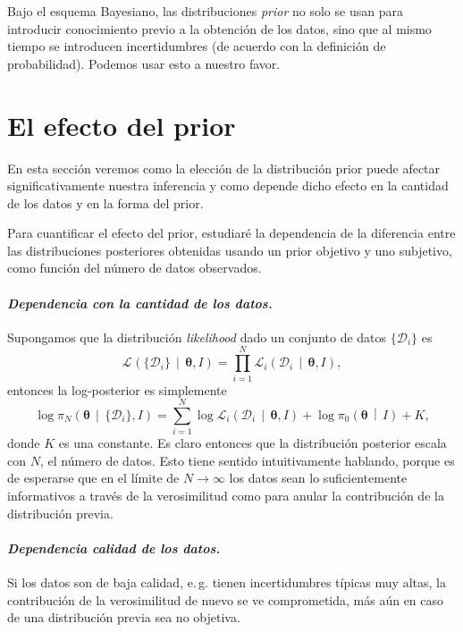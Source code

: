 \documentclass[a4paper,twoside]{article}
\newcommand{\hip}{\ensuremath{\mathbold{\theta}}\xspace}
\newcommand{\dat}[1][i]{\ensuremath{\{\mathcal{D}_{#1}\}}\xspace}
\newcommand{\pos}[2]{\ensuremath{\pi_N\left(#1\,\middle|\, #2\right)}\xspace}
\newcommand{\pri}[2]{\ensuremath{\pi_0\left(#1\,\middle|\, #2\right)}\xspace}
\newcommand{\lik}[3][]{\ensuremath{\mathcal{L}_{#1}\left(#2\,\middle|\, #3\right)}\xspace}
\begin{document}
Bajo el esquema Bayesiano, las distribuciones \emph{prior} no solo se usan para introducir
conocimiento previo a la obtención de los datos, sino que al mismo tiempo se introducen
incertidumbres (de acuerdo con la definición de probabilidad). Podemos usar esto a nuestro favor.


\section*{El efecto del prior}
%
En esta sección veremos como la elección de la distribución prior puede afectar significativamente
nuestra inferencia y como depende dicho efecto en la cantidad de los datos y en la forma del prior.

Para cuantificar el efecto del prior, estudiaré la dependencia de la diferencia entre las
distribuciones posteriores obtenidas usando un prior objetivo y uno subjetivo, como función del
número de datos observados.

\paragraph{\textit{\color{teal}Dependencia con la cantidad de los datos.}} Supongamos que la
distribución \emph{likelihood} dado un conjunto de datos $\dat$ es
%
$$\lik{\dat}{\hip,I} = \prod_{i=1}^N\lik[i]{\mathcal{D}_i}{\hip,I},$$
%
entonces la log-posterior es simplemente
%
$$\log{\pos{\hip}{\dat,I}} = \sum_{i=1}^N\log{\lik[i]{\mathcal{D}_i}{\hip,I}} + \log{\pri{\hip}{I}} + K,$$
%
donde $K$ es una constante. Es claro entonces que la distribución posterior escala con $N$, el
número de datos. Esto tiene sentido intuitivamente hablando, porque es de esperarse que en el límite
de $N\to\infty$ los datos sean lo suficientemente informativos a través de la verosimilitud como
para anular la contribución de la distribución previa.

\paragraph{\textit{\color{teal}Dependencia calidad de los datos.}} Si los datos son de baja calidad,
e.\,g. tienen incertidumbres típicas muy altas, la contribución de la verosimilitud de nuevo se ve
comprometida, más aún en caso de una distribución previa sea no objetiva.
\end{document}
